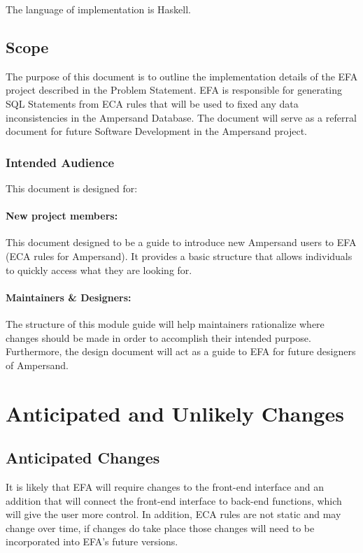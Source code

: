 \documentclass[12pt, svgnames]{article}
\begin{document}
The language of implementation is Haskell.

\subsection{Scope}
The purpose of this document is to outline the implementation details of the EFA project described in the Problem Statement.
EFA is responsible for generating SQL Statements from ECA rules that will 
be used to fixed any data inconsistencies in the Ampersand Database. 
The document will serve as a referral document for future Software Development in the Ampersand project.

\subsubsection{Intended Audience}
This document is designed for:
\paragraph{New project members:}
This document designed to be a guide to introduce new Ampersand users to EFA 
(ECA rules for Ampersand). It provides a basic structure that allows 
individuals to quickly access what they are looking for.
   
\paragraph{Maintainers \& Designers:} The structure of this module guide will 
help maintainers rationalize where changes should be made in order to 
accomplish their intended purpose. Furthermore, the design document will act as 
a guide to EFA for future designers of Ampersand.

\section{Anticipated and Unlikely Changes}
\subsection{Anticipated Changes}
It is likely that EFA will require changes to the front-end interface and an 
addition that will connect the front-end interface to back-end functions, which 
will give the user more control. In addition, ECA rules are not static and may 
change over time, if changes do take place those changes will need to be 
incorporated into EFA's future versions. 
\end{document}
